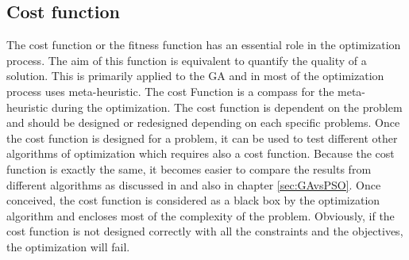 %
%
%




\subsection{Cost function }\label{sec:CostFunctionGA}
	The cost function or the fitness function has an essential role in the optimization process.  The aim of this function is equivalent to quantify the quality of a solution. This is primarily applied  to the GA and in most of the optimization process uses meta-heuristic. The cost Function is a compass for the meta-heuristic during the  optimization. 
	The cost function is dependent on the problem and should be designed or redesigned depending on each specific  problems. Once the cost function is designed for a problem, it can be used to test different other algorithms of optimization which requires also a cost function. 
	Because the cost function is exactly the same, it becomes easier to compare the results from different algorithms as discussed in \cite{79*franccois2001} and also in chapter \ref{sec:GAvsPSO}.%
	Once conceived, the cost function is considered as a black box by the optimization algorithm and encloses most of the complexity of the problem. Obviously, if the cost function is not designed correctly with all the constraints and the objectives, the optimization will fail.\\

